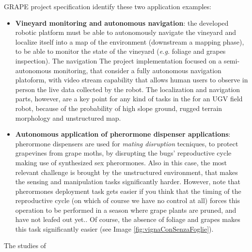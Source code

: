 \ac{GRAPE} project specification identify these two application examples:
\begin{itemize}
	\item \textbf{Vineyard monitoring and autonomous navigation}: the developed robotic platform must be able to autonomously navigate the vineyard and localize itself into a map of the environment (downstream a mapping phase), to be able to monitor the state of the vineyard (\textit{e.g.} foliage and grapes inspection). The navigation The project implementation focused on a semi-autonomous monitoring, that consider a fully autonomous navigation platoform, with video stream capability that allows human users to observe in person the live data collected by the robot. The localization and navigation parts, however, are a key point for any kind of tasks in the for an \ac{UGV} field robot, because of the probability of high slope ground, rugged terrain morphology and unstructured map. 
	\item \textbf{Autonomous application of pherormone dispenser applications}: pherormone dispensers are used for \textit{mating disruption} tecniques, to protect grapevines from grape moths, by disrupting the bugs' reproductive cycle making use of synthesized sex pherormones. Also in this case, the most relevant challenge is brought by the unstructured environment, that makes the sensing and manipulation tasks significantly harder.  However, note that pherormones deployment task gets easier if you think that the timing of the reproductive cycle (on which of course we have no control at all) forces this operation to be performed in a season where grape plants are pruned, and have not leafed out yet.\parencite{mateDisruptionEfficiency}. Of course, the absence of foliage and grapes makes this task significantly easier (see Image \ref{fig:vignaConSenzaFoglie}).
\end{itemize}

The studies of \cite{outdoorNavigation}


